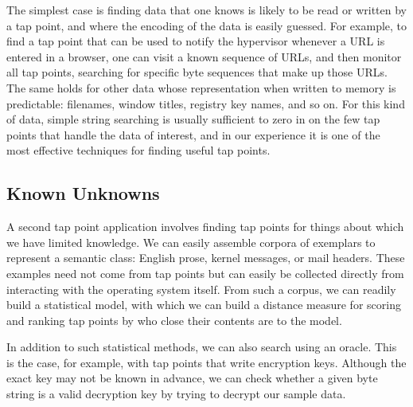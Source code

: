 The simplest case is finding data that one knows is likely to be read or
written by a tap point, and where the encoding of the data is easily
guessed. For example, to find a tap point that can be used to notify
the hypervisor whenever a URL is entered in a browser, one can visit a
known sequence of URLs, and then monitor all tap points, searching for
specific byte sequences that make up those URLs. The same holds for
other data whose representation when written to memory is predictable:
filenames, window titles, registry key names, and so on. For this kind
of data, simple string searching is usually sufficient to zero in on the
few tap points that handle the data of interest, and in our experience
it is one of the most effective techniques for finding useful tap
points.

\subsection{Known Unknowns}
\label{sec:technical:subsec:knownunk}

A second tap point application involves finding tap points for things
about which we have limited knowledge.
We can easily assemble corpora of exemplars to represent a semantic
class: English prose, kernel messages, or mail headers. These examples
need not come from tap points but can easily be collected directly from
interacting with the operating system itself. From such a corpus, we can
readily build a statistical model, with which we can build a distance
measure for scoring and ranking tap points by who close their contents
are to the model.




In addition to such statistical methods, we can also
search using an oracle.  
This is the case, for example, with tap points
that write encryption keys.
Although the exact key may not be known in
advance, we can check whether a given byte string is a valid
decryption key by trying to decrypt our sample data.


